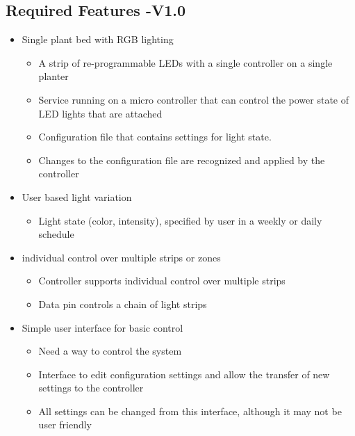 \documentclass[onecolumn, draftclsnofoot,10pt, compsoc]{article}
\begin{document}
\subsection{Required Features  -V1.0}
\begin{itemize}
	\item Single plant bed with RGB lighting
	\begin{itemize}
		\item A strip of re-programmable LEDs with a single controller on a single planter
		\item Service running on a micro controller that can control the power state of LED lights that are attached
		\item Configuration file that contains settings for light state.
		\item Changes to the configuration file are recognized and applied by the controller
	\end{itemize}
\end{itemize}
\begin{itemize}
	\item User based light variation
	\begin{itemize}
		\item Light state (color, intensity), specified by user in a weekly or daily schedule
	\end{itemize}
\end{itemize}
\begin{itemize}
	\item individual control over multiple strips or zones
	\begin{itemize}
		\item Controller supports individual control over multiple strips
		\item Data pin controls a chain of light strips
	\end{itemize}
\end{itemize}
\begin{itemize}
	\item Simple user interface for basic control
	\begin{itemize}
		\item Need a way to control the system
		\item Interface to edit configuration settings and allow the transfer of new settings to the controller
		\item All settings can be changed from this interface, although it may not be user friendly
	\end{itemize}
\end{itemize}
\end{document}
